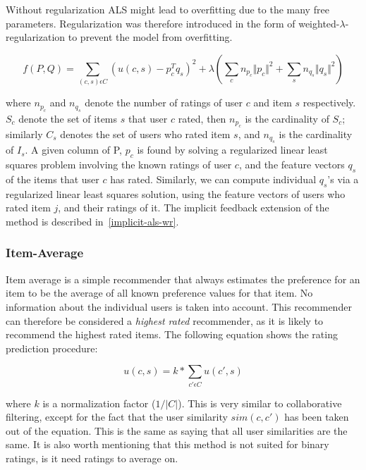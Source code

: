 Without regularization ALS might lead to overfitting due to the many free parameters. Regularization was
therefore introduced in the form of weighted-$\lambda$-regularization to prevent the model from overfitting.

\begin{equation}
f(P, Q) = \sum_{(c,s)\epsilon C} (u(c,s) - p^{T}_{c}q_{s})^{2} + \lambda (\sum_{c} n_{p_{c}} \Vert p_{c} \Vert ^{2} + \sum_{s} n_{q_{s}} \Vert q_{s} \Vert ^{2})
\label{WeightedLamba}
\end{equation}

where $n_{p_{c}}$ and $n_{q_{s}}$ denote the number of ratings of user $c$ and item $s$ respectively. $S_{c}$ denote
the set of items $s$ that user $c$ rated, then $n_{p_{c}}$ is the cardinality of $S_{c}$; similarly $C_{s}$ denotes
the set of users who rated item $s$, and $n_{q_{s}}$ is the cardinality of $I_{s}$. A given column of P, $p_{c}$ is
found by solving a regularized linear least squares problem involving the known ratings of user $c$, and the
feature vectors $q_{s}$ of the items that user $c$ has rated. Similarly, we can compute individual $q_{s}$'s via
a regularized linear least squares solution, using the feature vectors of users who rated item $j$, and their ratings of it.
The implicit feedback extension of the method is described in~\ref{implicit-als-wr}.

\subsubsection{Item-Average}

Item average is a simple recommender that always estimates the preference for an item to be the average of
all known preference values for that item. No information about the individual users is taken into account.
This recommender can therefore be considered a \emph{highest rated} recommender, as it is likely to recommend
the highest rated items. The following equation shows the rating prediction procedure:

\begin{equation}
\label{equation:itemaverageratingprediction}
u(c,s) = k * \sum_{c' \epsilon C} u(c',s)
\end{equation}

where $k$ is a normalization factor ($1/|C|$). This is very similar to collaborative filtering, except for
the fact that the user similarity $sim(c, c')$ has been taken out of the equation. This is the same as saying
that all user similarities are the same. It is also worth mentioning that this method is not suited for binary
ratings, is it need ratings to average on.

